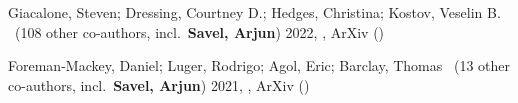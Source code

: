 \item[{\color{numcolor}\scriptsize2}] Giacalone, Steven; Dressing, Courtney D.; Hedges, Christina; Kostov, Veselin B. \etal\ ({108} other co-authors, incl.\ \textbf{Savel, Arjun}) 2022, , ArXiv ()

\item[{\color{numcolor}\scriptsize1}] Foreman-Mackey, Daniel; Luger, Rodrigo; Agol, Eric; Barclay, Thomas \etal\ ({13} other co-authors, incl.\ \textbf{Savel, Arjun}) 2021, , ArXiv ()